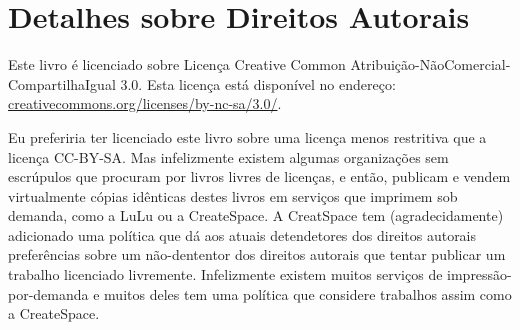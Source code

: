 
\chapter{Detalhes sobre Direitos Autorais}


Este livro é licenciado sobre Licença Creative Common
Atribuição-NãoComercial-CompartilhaIgual 3.0. Esta licença está disponível
no endereço: \url{creativecommons.org/licenses/by-nc-sa/3.0/}.


Eu preferiria ter licenciado este livro sobre uma licença menos restritiva 
que a licença CC-BY-SA. Mas infelizmente existem algumas organizações sem
escrúpulos que procuram por livros livres de licenças, e então, publicam e 
vendem virtualmente cópias idênticas destes livros em serviços que imprimem
sob demanda, como a LuLu ou a CreateSpace. A CreatSpace tem (agradecidamente)
adicionado uma política que dá aos atuais detendetores dos direitos autorais 
preferências sobre um não-dententor dos direitos autorais que tentar publicar 
um trabalho licenciado livremente. Infelizmente existem muitos serviços de 
impressão-por-demanda e muitos deles tem uma política que considere trabalhos
assim como a CreateSpace.


